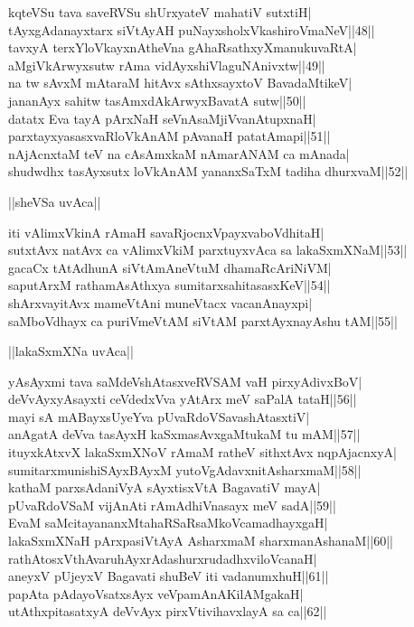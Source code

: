 \documentclass{article}
\begin{document}
kqteVSu tava saveRVSu shUrxyateV mahatiV sutxtiH|\\
tAyxgAdanayxtarx siVtAyAH puNayxsholxVkashiroVmaNeV||48||\\
tavxyA terxYloVkayxnAtheVna gAhaRsathxyXmanukuvaRtA|\\
aMgiVkArwyxsutw rAma vidAyxshiVlaguNAnivxtw||49||\\
na tw sAvxM mAtaraM hitAvx sAthxsayxtoV BavadaMtikeV|\\
jananAyx sahitw tasAmxdAkArwyxBavatA sutw||50||\\
datatx Eva tayA pArxNaH seVnAsaMjiVvanAtupxnaH|\\
parxtayxyasasxvaRloVkAnAM pAvanaH patatAmapi||51||\\
nAjAcnxtaM teV na cAsAmxkaM nAmarANAM ca mAnada|\\
shudwdhx tasAyxsutx loVkAnAM yananxSaTxM tadiha dhurxvaM||52||\\

\begin{center}
||sheVSa uvAca||
\end{center}

iti vAlimxVkinA rAmaH savaRjocnxVpayxvaboVdhitaH|\\
sutxtAvx natAvx ca vAlimxVkiM parxtuyxvAca sa lakaSxmXNaM||53||\\
gacaCx tAtAdhunA siVtAmAneVtuM dhamaRcAriNiVM|\\
saputArxM rathamAsAthxya sumitarxsahitasasxKeV||54||\\
shArxvayitAvx mameVtAni muneVtacx vacanAnayxpi|\\
saMboVdhayx ca puriVmeVtAM siVtAM parxtAyxnayAshu tAM||55||\\

\begin{center}
||lakaSxmXNa uvAca||
\end{center}

yAsAyxmi tava saMdeVshAtasxveRVSAM vaH pirxyAdivxBoV|\\
deVvAyxyAsayxti ceVdedxVva yAtArx meV saPalA tataH||56||\\
mayi sA mABayxsUyeYva pUvaRdoVSavashAtasxtiV|\\
anAgatA deVva tasAyxH kaSxmasAvxgaMtukaM tu mAM||57||\\
ituyxkAtxvX lakaSxmXNoV rAmaM ratheV sithxtAvx nqpAjacnxyA|\\
sumitarxmunishiSAyxBAyxM yutoVgAdavxnitAsharxmaM||58||\\
kathaM parxsAdaniVyA sAyxtisxVtA BagavatiV mayA|\\
pUvaRdoVSaM vijAnAti rAmAdhiVnasayx meV sadA||59||\\
EvaM saMcitayananxMtahaRSaRsaMkoVcamadhayxgaH|\\
lakaSxmXNaH pArxpasiVtAyA AsharxmaM sharxmanAshanaM||60||\\
rathAtosxVthAvaruhAyxrAdashurxrudadhxviloVcanaH|\\
aneyxV pUjeyxV Bagavati shuBeV iti vadanumxhuH||61||\\
papAta pAdayoVsatxsAyx veVpamAnAKilAMgakaH|\\
utAthxpitasatxyA deVvAyx pirxVtivihavxlayA sa ca||62||\\
\end{document}
